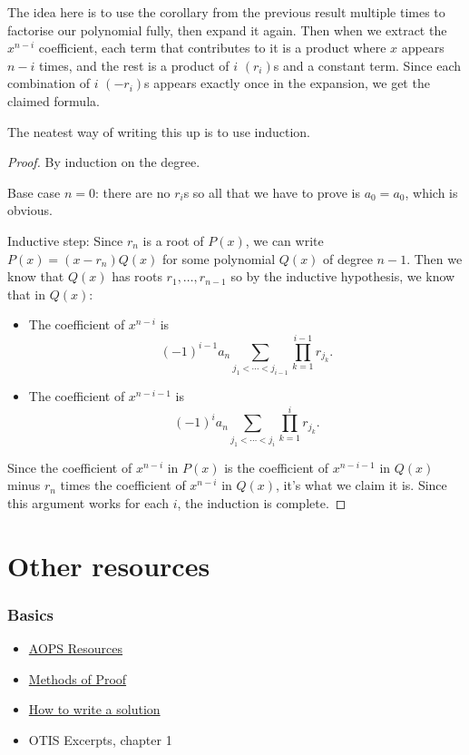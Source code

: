 \documentclass{amsart}
\begin{document}
The idea here is to use the corollary from the 
previous result multiple times to factorise our
polynomial fully, then expand it again. Then when we extract the $x^{n-i}$
coefficient, each term that contributes to it is a product where $x$ appears
$n-i$ times, and the rest is a product of $i$ $(r_i)$s and a constant term.
Since each combination of $i$ $(-r_i)$s appears exactly once in the expansion,
we get the claimed formula.

The neatest way of writing this up is to use induction.
\begin{proof}
  By induction on the degree.

  Base case $n=0$: there are no $r_i$s so all that
  we have to prove is $a_0=a_0$, which is obvious.

  Inductive step: Since $r_n$ is a root of $P(x)$, we can write
  $P(x)=(x-r_n)Q(x)$ for some polynomial $Q(x)$ of degree $n-1$. Then we know
  that $Q(x)$ has roots $r_1,\ldots,r_{n-1}$ so by the inductive hypothesis, we
  know that in $Q(x)$:
  \begin{itemize}
    \item The coefficient of $x^{n-i}$ is
      \[(-1)^{i-1}a_n\sum_{j_1<\cdots<j_{i-1}}\prod_{k=1}^{i-1}r_{j_k}.\]
    \item The coefficient of $x^{n-i-1}$ is
      \[(-1)^{i}a_n\sum_{j_1<\cdots<j_i}\prod_{k=1}^i r_{j_k}.\]
  \end{itemize}
  Since the coefficient of $x^{n-i}$ in $P(x)$ is the coefficient of $x^{n-i-1}$
  in $Q(x)$ minus $r_n$ times the coefficient of $x^{n-i}$ in $Q(x)$, it's what
  we claim it is. Since this argument works for each $i$, the induction is
  complete.
\end{proof}
\newpage
\part{Other resources}
\setcounter{section}{0}
\section{Basics}
\begin{itemize}
  \item \href{https://artofproblemsolving.com/resources}{AOPS Resources}
  \item
    \href{https://www.its.caltech.edu/~kpilch/olympiad/MethodsOfProof-Complete.pdf}
    {Methods of Proof}
  \item \href{https://artofproblemsolving.com/news/articles/how-to-write-a-solution}
    {How to write a solution}
  \item OTIS Excerpts, chapter 1
\end{itemize}
\end{document}
